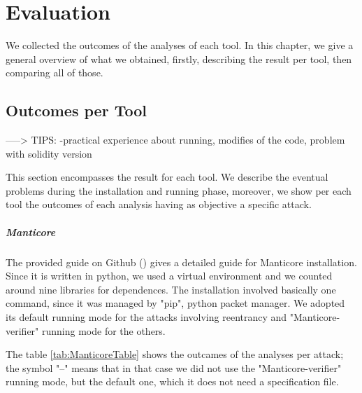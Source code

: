 
\chapter{Evaluation}
\label{ch:Evaluation}
We collected the outcomes of the analyses of each tool. 
In this chapter, we give a general overview of what we obtained, firstly,
describing the result per tool, then comparing all of those.



\section{Outcomes per Tool}

-----> TIPS: -practical experience about running, modifies of the  code, problem with solidity version 

This section encompasses the result for each tool. 
We describe the eventual problems during the installation and running phase, moreover, we show per each tool the outcomes of each analysis having as objective a specific attack. 

\paragraph{Manticore} The provided guide on Github (\cite{ManticoreGitHub}) gives a detailed guide for Manticore installation. 
Since it is written in python, we used a virtual environment and we counted around nine libraries for dependences. The installation involved basically one command, since it was managed by "pip", python packet manager.
We adopted its default running mode for the attacks involving reentrancy and "Manticore-verifier" running mode for the others. 

The table \autoref*{tab:ManticoreTable} shows the outcames of the analyses per attack; the symbol "--" means that in that case we did not use the 
"Manticore-verifier" running mode, but the default one, which it does not need a specification file.

